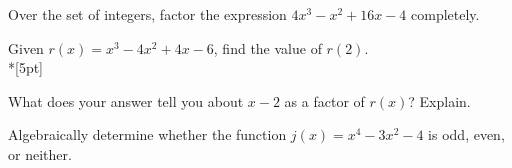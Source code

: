 \item %
Over the set of integers, factor the expression $4x^3 - x^2 +16x - 4$ completely.

\item %
Given $r(x) = x^3  - 4x^2 +4x -6$, find the value of $r(2)$.\\*[5pt]

What does your answer tell you about $x - 2$ as a factor of $r(x)$? Explain.

\item %
Algebraically determine whether the function $j(x)=x^4 - 3x^2 -4$ is odd, even, or neither.

